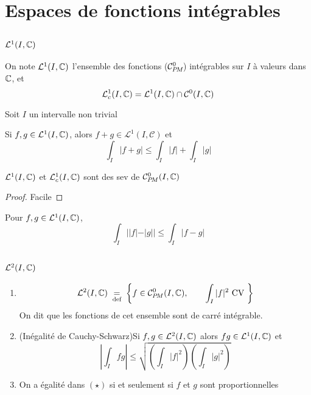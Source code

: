 \section{Espaces de fonctions intégrables}

\subsection{$\mathcal L^1(I, \mathbb C)$}

\begin{dfn}
    On note $\mathcal L^1(I, \mathbb C)$ l'ensemble des fonctions ($\CPM\!$) intégrables sur $I$ à valeurs dans $\mathbb C$, et \[\mathcal L^1_c(I, \mathbb C)=\mathcal L^1(I, \mathbb C)\cap \mathcal C^0(I, \mathbb C)\]
\end{dfn}

\begin{prop}
    \Hyp Soit $I$ un intervalle non trivial
    \begin{concenum}
    \item
        Si $f, g\in\mathcal L^1(I, \mathbb C)$, alors $f+g\in\mathcal L^1(I, \mathcal C)$ et \[
            \int_I|f+g|\leq \int_I|f|+\int_I|g|
        \]
    \item $\mathcal L^1(I, \mathbb C)$ et $\mathcal L^1_c(I, \mathbb C)$ sont des sev de $\CPM(I, \C)$
    \end{concenum}
\end{prop}
\begin{proof}
    Facile
\end{proof}

\begin{rem}
    Pour $f, g\in\mathcal L^1(I, \mathbb C)$, \[
        \int_I||f|-|g||\leq \int_I|f-g|
    \]
\end{rem}

\subsection{$\mathcal L^2(I, \mathbb C)$}

\begin{thmdef}
    \begin{enumerate}
        \item \[
                \mathcal L^2(I, \C)\defeq \left\{f\in\CPM(I, \C), \qquad \int_I|f|^2\text{ CV }\right\}
            \]
            On dit que les fonctions de cet ensemble sont de carré intégrable.
        \item (Inégalité de Cauchy-Schwarz)Si $f, g\in\mathcal L^2(I, \mathbb C)$ alors $fg\in\mathcal L^1(I, \mathbb C)$ et \[
                \left| \int_Ifg \right|\leq \sqrt{ \left( \int_I|f|^2 \right)  \left( \int_I|g|^2 \right)} \tag{$\star$}
            \]
        \item On a égalité dans $(\star)$ si et seulement si $f$ et $g$ sont proportionnelles
    \end{enumerate}
\end{thmdef}

